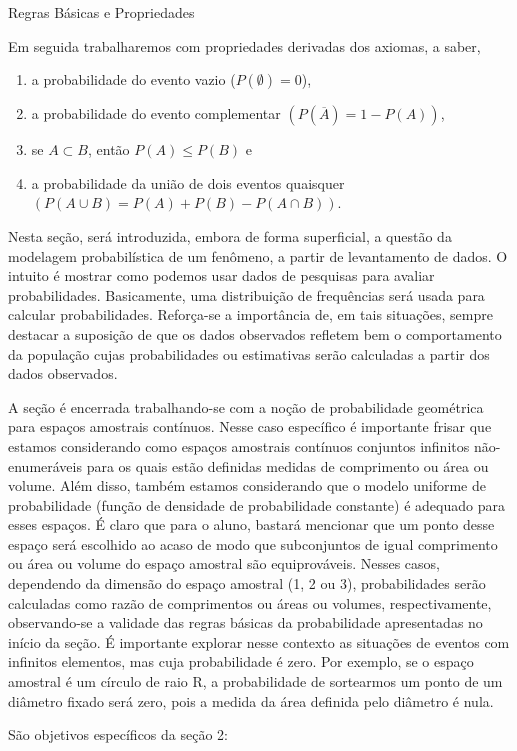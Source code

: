 \begin{paginatexto}{Regras Básicas e Propriedades}
{Em seguida trabalharemos com propriedades derivadas dos axiomas, a saber, 
\begin{enumerate}
\item a probabilidade do evento vazio ($P(\emptyset)=0$),
\item a probabilidade do evento complementar $(P(\overline{A})=1-P(A))$, 
\item se $A\subset B$, então $P(A)\leq P(B)$ e 
\item a probabilidade da união de dois eventos quaisquer $(P(A\cup B)=P(A)+P(B)-P(A\cap B))$.
\end{enumerate}

Nesta seção, será introduzida, embora de forma superficial, a questão da modelagem probabilística de um fenômeno, a partir de levantamento de dados. O intuito é mostrar como podemos usar dados de pesquisas para avaliar probabilidades. Basicamente, uma distribuição de frequências será usada para calcular probabilidades. Reforça-se a importância de, em tais situações, sempre destacar a suposição de que os dados observados refletem bem o comportamento da população cujas probabilidades ou estimativas serão calculadas a partir dos dados observados.

A seção é encerrada trabalhando-se com a noção de probabilidade geométrica para espaços amostrais contínuos. Nesse caso específico é importante frisar que estamos considerando como espaços amostrais contínuos conjuntos infinitos não-enumeráveis para os quais estão definidas medidas de comprimento ou área ou volume. Além disso, também estamos considerando que o modelo uniforme de probabilidade (função de densidade de probabilidade constante) é adequado para esses espaços. É claro que para o aluno, bastará mencionar que um ponto desse espaço será escolhido ao acaso de modo que subconjuntos de igual comprimento ou área ou volume do espaço amostral são equiprováveis. Nesses casos, dependendo da dimensão do espaço amostral (1, 2 ou 3), probabilidades serão calculadas como razão de comprimentos ou áreas ou volumes, respectivamente, observando-se a validade das regras básicas da probabilidade apresentadas no início da seção. É importante explorar nesse contexto as situações de eventos com infinitos elementos, mas cuja probabilidade é zero. Por exemplo, se o espaço amostral é um círculo de raio R, a probabilidade de sortearmos um ponto de um diâmetro fixado será zero, pois a medida da área definida pelo diâmetro é nula.

São objetivos específicos da seção 2:

}
\end{paginatexto}
